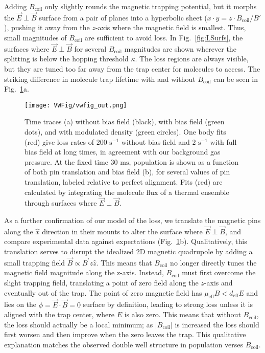 \documentclass[%
 reprint,
 amsmath,amssymb,
 aps,
prl,
]{revtex4-1}
\newcommand{\bcl}{{$B_\text{coil}$}}
\newcommand{\epb}{{$\vec{E}\!\perp\!\vec{B}$}}
\newcommand{\cmnt}[1]{\ignorespaces}
\begin{document}
Adding \bcl{} only slightly rounds the magnetic trapping potential, but it morphs the \epb{} surface from a pair of planes into a hyperbolic sheet ($x\cdot y= z\cdot B_\text{coil}/B'$), pushing it away from the $z$-axis where the magnetic field is smallest. Thus, small magnitudes of \bcl{} are sufficient to avoid loss. In Fig.~\ref{fig:LSurfs}, the surfaces where \epb{} for several \bcl{} magnitudes are shown wherever the splitting is below the hopping threshold $\kappa$. The loss regions are always visible, but they are tuned too far away from the trap center for molecules to access. The striking difference in molecule trap lifetime with and without \bcl{} can be seen in Fig.~\ref{fig:WVplot}a.

\begin{figure}[tb]
\texttt{[image: VWFig/vwfig\_out.png]}%
\caption{
Time traces (a) without bias field (black), with bias field (green dots), and with modulated density (green circles). One body fits (red) give loss rates of $200\text{ s}^{-1}$ without bias field and $2\text{ s}^{-1}$ with full bias field at long times, in agreement with our background gas pressure. At the fixed time $30\text{ ms}$, population is shown as a function of both pin translation and bias field (b), for several values of pin translation, labeled relative to perfect alignment. Fits (red) are calculated by integrating the molecule flux of a thermal ensemble through surfaces where \epb.
\label{fig:WVplot}}
\end{figure}


As a further confirmation of our \cmnt{\epb{}  and $\mu_\text{eff}B<d_\text{eff}E$} model of the loss, we translate the magnetic pins along the $\hat{x}$ direction in their mounts to alter the surface where \epb{}, and compare experimental data against expectations (Fig.~\ref{fig:WVplot}b). Qualitatively, this translation serves to disrupt the idealized 2D magnetic quadrupole by adding a small trapping field $\vec{B}\propto B^\prime z\hat{z}$. This means that \bcl{} no longer directly tunes the magnetic field magnitude along the z-axis. Instead, \bcl{} must first overcome the slight trapping field, translating a point of zero field along the $z$-axis and eventually out of the trap. The point of zero magnetic field has $\mu_\text{eff}B<d_\text{eff}E$ and lies on the $\phi=\vec{E}\cdot\vec{B}=0$ surface by definition, leading to strong loss unless it is aligned with the trap center, where $E$ is also zero. This means that without \bcl{}, the loss should actually be a local minimum; as $|B_\text{coil}|$ is increased the loss should first worsen and then improve when the zero leaves the trap. This qualitative explanation matches the observed double well structure in population verses \bcl.
\end{document}
